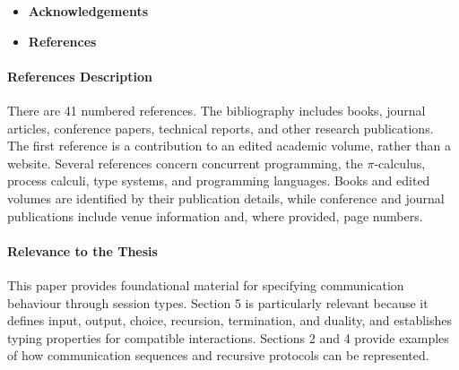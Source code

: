 \begin{itemize}
\begin{itemize}
        \item \textbf{6.2 Related Works and Further Issues}
        \begin{itemize}
            \item Comparison with conventional concurrent programming languages.
            \item Relationship between sessions and the $\pi$-calculus.
            \item Comparison with typed concurrent languages and process calculi.
            \item Benefits of explicit session structure for behavioural abstraction.
            \item Static detection of incompatible communication patterns.
            \item Further questions concerning channel usage and type-system extensions.
        \end{itemize}
    \end{itemize}

    \item \textbf{Acknowledgements}

    \item \textbf{References}
\end{itemize}

\paragraph{References Description}
There are 41 numbered references. The bibliography includes books, journal articles,
conference papers, technical reports, and other research publications. The first
reference is a contribution to an edited academic volume, rather than a website.
Several references concern concurrent programming, the $\pi$-calculus, process
calculi, type systems, and programming languages. Books and edited volumes are
identified by their publication details, while conference and journal publications
include venue information and, where provided, page numbers.

\paragraph{Relevance to the Thesis}
This paper provides foundational material for specifying communication behaviour
through session types. Section 5 is particularly relevant because it defines input,
output, choice, recursion, termination, and duality, and establishes typing properties
for compatible interactions. Sections 2 and 4 provide examples of how communication
sequences and recursive protocols can be represented.

